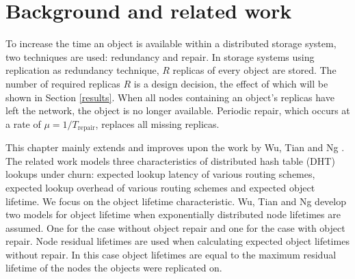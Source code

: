 \documentclass[10pt,a4paper,conference]{IEEEtran}
\begin{document}
\section{Background and related work}
\label{model_related_work}

To increase the time an object is available within a distributed storage system, two techniques are used: redundancy and repair. In storage systems using replication as redundancy technique, $R$ replicas of every object are stored. The number of required replicas $R$ is a design decision, the effect of which will be shown in Section \ref{results}. When all nodes containing an object's replicas have left the network, the object is no longer available. Periodic repair, which occurs at a rate of $\mu = 1/T_{\textrm{repair}}$, replaces all missing replicas.

This chapter mainly extends and improves upon the work by Wu, Tian and Ng \cite{replication_article}. The related work models three characteristics of distributed hash table (DHT) lookups under churn: expected lookup latency of various routing schemes, expected lookup overhead of various routing schemes and expected object lifetime. We focus on the object lifetime characteristic. Wu, Tian and Ng develop two models for object lifetime when exponentially distributed node lifetimes are assumed. One for the case without object repair and one for the case with object repair. Node residual lifetimes are used when calculating expected object lifetimes without repair. In this case object lifetimes are equal to the maximum residual lifetime of the nodes the objects were replicated on.

\end{document}
